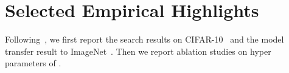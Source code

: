 \section{Selected Empirical Highlights}
\label{sec:nas_experiment}








Following~\citep{NASCell}, we first report the search results on CIFAR-10~\citep{cifar} and the model transfer result to ImageNet~\citep{ILSVRC15}. Then we report ablation studies on hyper parameters of \Petridish. 

